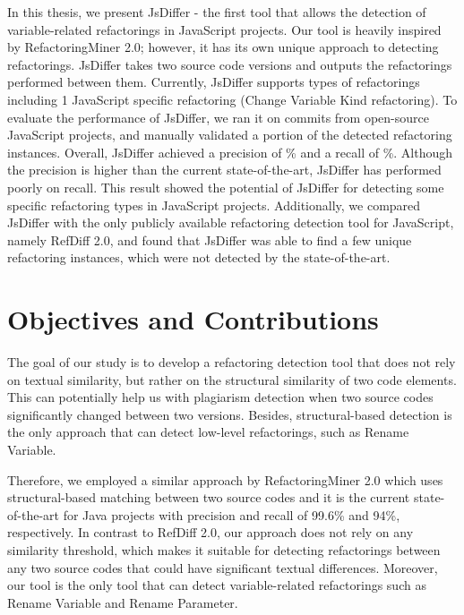 \documentclass[letterpaper,12pt,onecolumn,final]{report}
\begin{document}
In this thesis, we present JsDiffer - the first tool that allows the detection of variable-related refactorings in JavaScript projects. Our tool is heavily inspired by RefactoringMiner 2.0; however, it has its own unique approach to detecting refactorings. JsDiffer takes two source code versions and outputs the refactorings performed between them. Currently, JsDiffer supports \supportedRefTypesJsDiffer{} types of refactorings including 1 JavaScript specific refactoring (Change Variable Kind refactoring). To evaluate the performance of JsDiffer, we ran it on \evTotalCommits{} commits from \evTotalProjectCounts{} open-source JavaScript projects, and manually validated a portion of the detected refactoring instances. Overall, JsDiffer achieved a precision of \rmOverallPrecision{}\% and a recall of \rmOverallRecall{}\%. Although the precision is higher than the current state-of-the-art, JsDiffer has performed poorly on recall. This result showed the potential of JsDiffer for detecting some specific refactoring types in JavaScript projects. Additionally, we compared JsDiffer with the only publicly available refactoring detection tool for JavaScript, namely RefDiff 2.0, and found that JsDiffer was able to find a few unique refactoring instances, which were not detected by the state-of-the-art.


\section{Objectives and Contributions}
The goal of our study is to develop a refactoring detection tool that does not rely on textual similarity, but rather on the structural similarity of two code elements. This can potentially help us with plagiarism detection when two source codes significantly changed between two versions. Besides, structural-based detection is the only approach that can detect low-level refactorings, such as Rename Variable.

Therefore, we employed a similar approach by RefactoringMiner 2.0  \cite{Tsantalis2020}  which uses structural-based matching between two source codes and it is the current state-of-the-art for Java projects with precision and recall of 99.6\% and 94\%, respectively. In contrast to RefDiff 2.0, our approach does not rely on any similarity threshold, which makes it suitable for detecting refactorings between any two source codes that could have significant textual differences. Moreover, our tool is the only tool that can detect variable-related refactorings such as Rename Variable and Rename Parameter.
\end{document}
